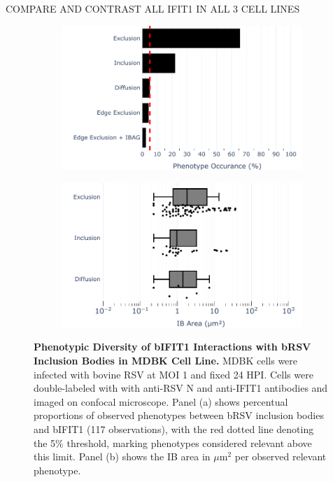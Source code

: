 COMPARE AND CONTRAST ALL IFIT1 IN ALL 3 CELL LINES

\begin{figure}
    \begin{subfigure}{0.495\textwidth}
        \caption{}
        \includegraphics[width=1\linewidth]{08. Chapter 3/Figs/02. Infection/01. IFIT1/07. bar_i1_mdbk.pdf} 
    \end{subfigure}
    \begin{subfigure}{0.495\textwidth}
        \caption{}
        \includegraphics[width=1\linewidth]{08. Chapter 3/Figs/02. Infection/01. IFIT1/08. box_i1_mdbk.pdf}
    \end{subfigure}
    \caption[Phenotypic Diversity of bIFIT1 Interactions with bRSV Inclusion Bodies in MDBK Cell Line.]{\textbf{Phenotypic Diversity of bIFIT1 Interactions with bRSV Inclusion Bodies in MDBK Cell Line.} MDBK cells were infected with bovine RSV at MOI 1 and fixed 24 HPI. Cells were double-labeled with with anti-RSV N and anti-IFIT1 antibodies and imaged on confocal microscope. Panel (a) shows percentual proportions of observed phenotypes between bRSV inclusion bodies and bIFIT1 (117 observations), with the red dotted line denoting the 5\% threshold, marking phenotypes considered relevant above this limit. Panel (b) shows the IB area in \(\mu \mbox{m}^2\) per observed relevant phenotype.}
    \label{fig:Phenotypic Diversity of bIFIT1 Interactions with bRSV Inclusion Bodies in MDBK Cell Line}
\end{figure}

